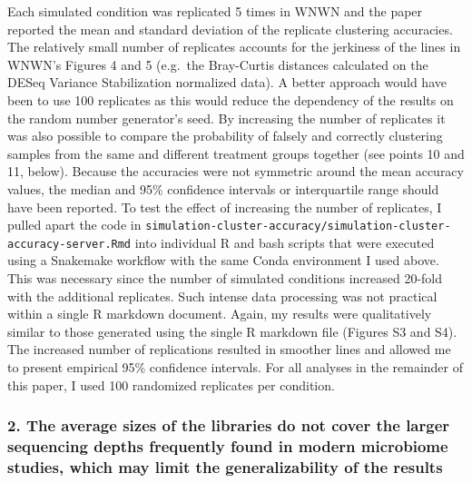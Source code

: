 \documentclass[
]{article}
\begin{document}
Each simulated condition was replicated 5 times in WNWN and the paper
reported the mean and standard deviation of the replicate clustering
accuracies. The relatively small number of replicates accounts for the
jerkiness of the lines in WNWN's Figures 4 and 5 (e.g.~the Bray-Curtis
distances calculated on the DESeq Variance Stabilization normalized
data). A better approach would have been to use 100 replicates as this
would reduce the dependency of the results on the random number
generator's seed. By increasing the number of replicates it was also
possible to compare the probability of falsely and correctly clustering
samples from the same and different treatment groups together (see
points 10 and 11, below). Because the accuracies were not symmetric
around the mean accuracy values, the median and 95\% confidence
intervals or interquartile range should have been reported. To test the
effect of increasing the number of replicates, I pulled apart the code
in
\texttt{simulation-cluster-accuracy/simulation-cluster-accuracy-server.Rmd}
into individual R and bash scripts that were executed using a Snakemake
workflow with the same Conda environment I used above. This was
necessary since the number of simulated conditions increased 20-fold
with the additional replicates. Such intense data processing was not
practical within a single R markdown document. Again, my results were
qualitatively similar to those generated using the single R markdown
file (Figures S3 and S4). The increased number of replications resulted
in smoother lines and allowed me to present empirical 95\% confidence
intervals. For all analyses in the remainder of this paper, I used 100
randomized replicates per condition.

\hypertarget{the-average-sizes-of-the-libraries-do-not-cover-the-larger-sequencing-depths-frequently-found-in-modern-microbiome-studies-which-may-limit-the-generalizability-of-the-results}{%
\subsubsection{2. The average sizes of the libraries do not cover the
larger sequencing depths frequently found in modern microbiome studies,
which may limit the generalizability of the
results}\label{the-average-sizes-of-the-libraries-do-not-cover-the-larger-sequencing-depths-frequently-found-in-modern-microbiome-studies-which-may-limit-the-generalizability-of-the-results}}
\end{document}
